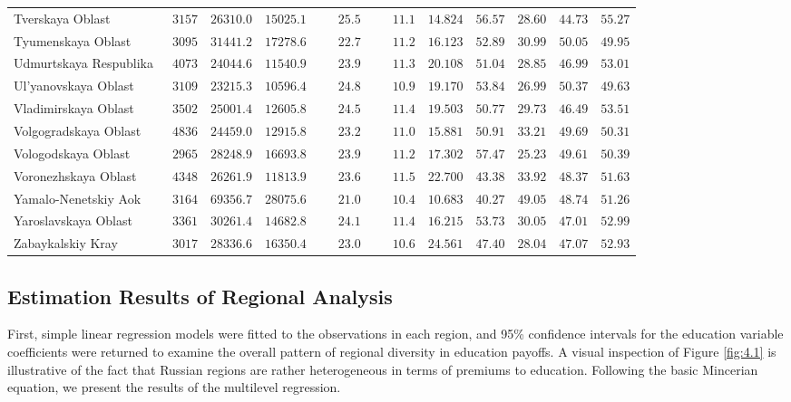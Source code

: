 \documentclass[12pt,a4paper]{article}
\numberwithin{equation}{section}
\begin{document}
{\begin{longtable}{lcccccccccc}
		Tverskaya Oblast  & $\phantom{0}3157$ & $26310.0$ & $15025.1$ & $\phantom{000}25.5$ & $\phantom{000}11.1$ & $14.824$ & $56.57$ & $28.60$ & $44.73$ & $55.27$ \\
		Tyumenskaya Oblast  & $\phantom{0}3095$ & $31441.2$ & $17278.6$ & $\phantom{000}22.7$ & $\phantom{000}11.2$ & $16.123$ & $52.89$ & $30.99$ & $50.05$ & $49.95$ \\
		Udmurtskaya Respublika  & $\phantom{0}4073$ & $24044.6$ & $11540.9$ & $\phantom{000}23.9$ & $\phantom{000}11.3$ & $20.108$ & $51.04$ & $28.85$ & $46.99$ & $53.01$ \\
		Ul'yanovskaya Oblast  & $\phantom{0}3109$ & $23215.3$ & $10596.4$ & $\phantom{000}24.8$ & $\phantom{000}10.9$ & $19.170$ & $53.84$ & $26.99$ & $50.37$ & $49.63$ \\
		Vladimirskaya Oblast  & $\phantom{0}3502$ & $25001.4$ & $12605.8$ & $\phantom{000}24.5$ & $\phantom{000}11.4$ & $19.503$ & $50.77$ & $29.73$ & $46.49$ & $53.51$ \\
		Volgogradskaya Oblast  & $\phantom{0}4836$ & $24459.0$ & $12915.8$ & $\phantom{000}23.2$ & $\phantom{000}11.0$ & $15.881$ & $50.91$ & $33.21$ & $49.69$ & $50.31$ \\
		Vologodskaya Oblast  & $\phantom{0}2965$ & $28248.9$ & $16693.8$ & $\phantom{000}23.9$ & $\phantom{000}11.2$ & $17.302$ & $57.47$ & $25.23$ & $49.61$ & $50.39$ \\
		Voronezhskaya Oblast  & $\phantom{0}4348$ & $26261.9$ & $11813.9$ & $\phantom{000}23.6$ & $\phantom{000}11.5$ & $22.700$ & $43.38$ & $33.92$ & $48.37$ & $51.63$ \\
		Yamalo-Nenetskiy Aok  & $\phantom{0}3164$ & $69356.7$ & $28075.6$ & $\phantom{000}21.0$ & $\phantom{000}10.4$ & $10.683$ & $40.27$ & $49.05$ & $48.74$ & $51.26$ \\
		Yaroslavskaya Oblast  & $\phantom{0}3361$ & $30261.4$ & $14682.8$ & $\phantom{000}24.1$ & $\phantom{000}11.4$ & $16.215$ & $53.73$ & $30.05$ & $47.01$ & $52.99$ \\
		Zabaykalskiy Kray  & $\phantom{0}3017$ & $28336.6$ & $16350.4$ & $\phantom{000}23.0$ & $\phantom{000}10.6$ & $24.561$ & $47.40$ & $28.04$ & $47.07$ & $52.93$ \\
		\hline 
	\end{longtable}
}

\subsection{Estimation Results of Regional Analysis}
First, simple linear regression models were fitted to the observations in each region, and 95\% confidence intervals for the education variable coefficients were returned to examine the overall pattern of regional diversity in education payoffs. A visual inspection of Figure \ref{fig:4.1} is illustrative of the fact that Russian regions are rather heterogeneous in terms of premiums to education. Following the basic Mincerian equation, we present the results of the multilevel regression.
\end{document}
